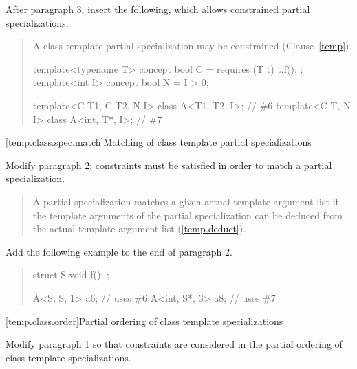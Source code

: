 After paragraph 3, insert the following, which allows constrained partial 
specializations.

\begin{quote}
\begin{addedblock}
\setcounter{Paras}{3}
\pnum
A class template partial specialization may be constrained
(Clause~\ref{temp}).
\enterexample
\begin{codeblock}
template<typename T> concept bool C = requires (T t) { t.f(); };
template<int I> concept bool N = I > 0;

template<C T1, C T2, N I> class A<T1, T2, I>;  // \#6
template<C T, N I>        class A<int, T*, I>; // \#7
\end{codeblock}
\exitexample
\end{addedblock}
\end{quote}

[temp.class.spec.match]{Matching of class template partial specializations}

Modify paragraph 2; constraints must be satisfied in order
to match a partial specialization. 

\begin{quote}
\setcounter{Paras}{1}
\pnum
A partial specialization matches a given actual template argument list if 
the template arguments of the partial specialization can be deduced from the 
actual template argument list (\ref{temp.deduct}).
\end{quote}

Add the following example to the end of paragraph 2.

\begin{quote}
\begin{addedblock}
\enterexample
\begin{codeblock}
struct S { void f(); };

A<S, S, 1>    a6; // uses \#6
A<int, S*, 3> a8; // uses \#7
\end{codeblock}
\exitexample
\end{addedblock}
\end{quote}


[temp.class.order]{Partial ordering of class template specializations}

Modify paragraph 1 so that constraints are considered in the
partial ordering of class template specializations. 

